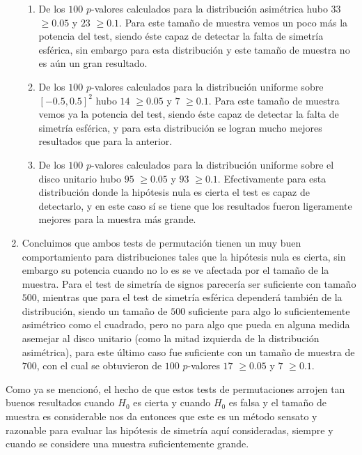 \documentclass[letter]{article}
\begin{document}
\begin{enumerate}
\begin{enumerate}[label=(\roman*)]
\item De los $100$ $p$-valores calculados para la distribución asimétrica hubo $33$ $\geq 0.05$ y $23$ $\geq 0.1$. Para este tamaño de muestra  vemos un poco más la potencia del test, siendo éste capaz de detectar la falta de simetría esférica, sin embargo para esta distribución y este tamaño de muestra no es aún un gran resultado.

\item De los $100$ $p$-valores calculados para la distribución uniforme sobre $[-0.5,0.5]^2$ hubo $14$ $\geq 0.05$ y $7$ $\geq 0.1$. Para este tamaño de muestra  vemos ya la potencia del test, siendo éste capaz de detectar la falta de simetría esférica, y para esta distribución se logran mucho mejores resultados que para la anterior.

\item De los $100$ $p$-valores calculados para la distribución uniforme sobre el disco unitario hubo $95$ $\geq 0.05$ y $93$ $\geq 0.1$. Efectivamente para esta distribución donde la hipótesis nula es cierta el test es capaz de detectarlo, y en este caso sí se tiene que los resultados fueron ligeramente mejores para la muestra más grande.

\end{enumerate}

\item Concluimos que ambos tests de permutación tienen un muy buen comportamiento para distribuciones tales que la hipótesis nula es cierta, sin embargo su potencia cuando no lo es se ve afectada por el tamaño de la muestra. Para el test de simetría de signos parecería ser suficiente con tamaño $500$, mientras que para el test de simetría esférica dependerá también de la distribución, siendo un tamaño de $500$ suficiente para algo lo suficientemente asimétrico como el cuadrado, pero no para algo que pueda en alguna medida asemejar al disco unitario (como la mitad izquierda de la distribución asimétrica), para este último caso fue suficiente con un tamaño de muestra de $700$, con el cual se obtuvieron de $100$ $p$-valores $17$ $\geq 0.05$ y $7$ $\geq 0.1$.

\end{enumerate}

Como ya se mencionó, el hecho de que estos tests de permutaciones arrojen tan buenos resultados cuando $H_0$ es cierta y cuando $H_0$ es falsa y el tamaño de muestra es considerable nos da entonces que este es un método sensato y razonable para evaluar las hipótesis de simetría aquí consideradas, siempre y cuando se considere una muestra suficientemente grande.
\end{document}
